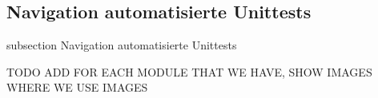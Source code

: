



\subsection*{Navigation automatisierte Unittests}\label{nav-unittests}
    {subsection}
    {Navigation automatisierte Unittests}

TODO ADD FOR EACH MODULE THAT WE HAVE, SHOW IMAGES WHERE WE USE IMAGES








